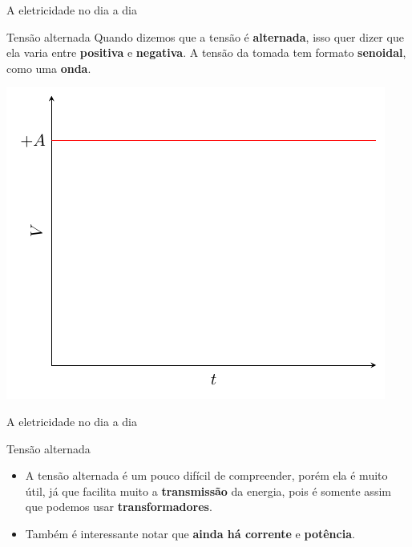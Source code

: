 \begin{frame}{A eletricidade no dia a dia}
	\begin{block}{Tensão alternada}
		Quando dizemos que a tensão é \textbf{alternada}, isso quer dizer que ela varia entre \textbf{positiva} e \textbf{negativa}. A tensão da tomada tem formato \textbf{senoidal}, como uma \textbf{onda}.
	\end{block}

	\centering
	\includegraphics[width=0.64\linewidth,page=2]{Figuras/Ch01/sinefunc}

\end{frame}


\begin{frame}{A eletricidade no dia a dia}
	\begin{block}{Tensão alternada}
		\begin{itemize}
			\item A tensão alternada é um pouco difícil de compreender, porém ela é muito útil, já que facilita muito a \textbf{transmissão} da energia, pois é somente assim que podemos usar \textbf{transformadores}.
			\item Também é interessante notar que \textbf{ainda há corrente} e \textbf{potência}.
		\end{itemize}
	\end{block}

\end{frame}


